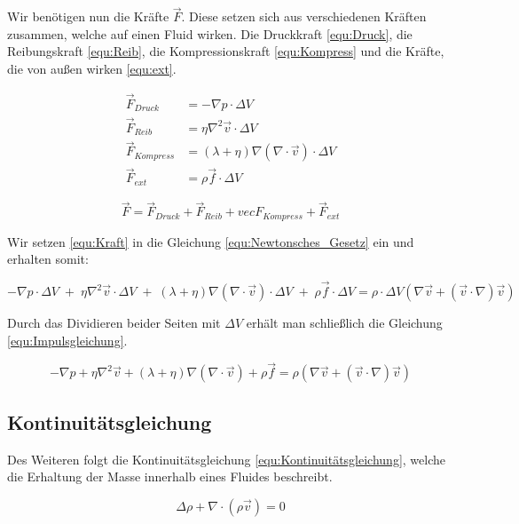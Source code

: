 \documentclass[a4paper, 12pt]{article}
\begin{document}
Wir benötigen nun die Kräfte $\vec{F}$. Diese setzen sich aus verschiedenen Kräften zusammen, welche auf einen Fluid wirken. Die Druckkraft \eqref{equ:Druck}, die Reibungskraft \eqref{equ:Reib}, die Kompressionskraft \eqref{equ:Kompress} und die Kräfte, die von außen wirken \eqref{equ:ext}.

\begin{align}
	\vec{F}_{Druck}    & = - \nabla p \cdot \Delta V \label{equ:Druck}                                             \\
	\vec{F}_{Reib}     & = \eta \nabla^2 \vec{v} \cdot \Delta V \label{equ:Reib}                                  \\
	\vec{F}_{Kompress} & = (\lambda + \eta)\nabla(\nabla \cdot \vec{v}) \cdot \Delta V \label{equ:Kompress} \\
	\vec{F}_{ext}      & = \rho \vec{f} \cdot \Delta V \label{equ:ext}
\end{align}

\begin{equation} \label{equ:Kraft}
	\vec{F} = \vec{F}_{Druck} + \vec{F}_{Reib} + vec{F}_{Kompress} + \vec{F}_{ext}
\end{equation}

Wir setzen \eqref{equ:Kraft} in die Gleichung \eqref{equ:Newtonsches_Gesetz} ein und erhalten somit:

\[- \nabla p \cdot \Delta V\;+\;\eta \nabla^2 \vec{v} \cdot \Delta V\;+\;(\lambda + \eta)\nabla(\nabla \cdot \vec{v}) \cdot \Delta V\;+\;\rho \vec{f} \cdot \Delta V = \rho \cdot \Delta V (\nabla \vec{v} + (\vec{v} \cdot \nabla)\vec{v})\]

Durch das Dividieren beider Seiten mit $\Delta V$ erhält man schließlich die Gleichung \eqref{equ:Impulsgleichung}.

\[- \nabla p + \eta \nabla^2 \vec{v} + (\lambda + \eta)\nabla(\nabla \cdot \vec{v}) + \rho \vec{f} = \rho (\nabla \vec{v} + (\vec{v} \cdot \nabla)\vec{v})\]

\subsection{Kontinuitätsgleichung}
Des Weiteren folgt die Kontinuitätsgleichung \eqref{equ:Kontinuitätsgleichung}, welche die Erhaltung der Masse innerhalb eines Fluides beschreibt.

\begin{equation} \label{equ:Kontinuitätsgleichung}
	\Delta \rho + \nabla \cdot (\rho \vec{v}) = 0
\end{equation}
\end{document}
